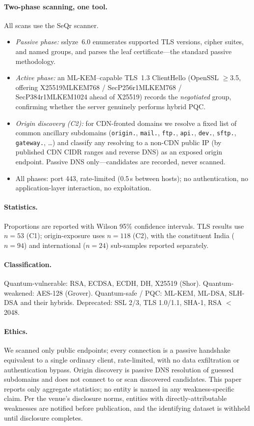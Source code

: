 \documentclass[11pt]{article}
\begin{document}
\paragraph{Two-phase scanning, one tool.} All scans use the SeQr scanner.
\begin{itemize}[leftmargin=1.4em,nosep]
  \item \emph{Passive phase:} sslyze~6.0 enumerates supported TLS versions, cipher suites, and
  named groups, and parses the leaf certificate---the standard passive methodology.
  \item \emph{Active phase:} an ML-KEM--capable TLS~1.3 ClientHello (OpenSSL $\geq$3.5, offering
  X25519MLKEM768 / SecP256r1MLKEM768 / SecP384r1MLKEM1024 ahead of X25519) records the
  \emph{negotiated} group, confirming whether the server genuinely performs hybrid PQC.
  \item \emph{Origin discovery (C2):} for CDN-fronted domains we resolve a fixed list of common
  ancillary subdomains (\texttt{origin.}, \texttt{mail.}, \texttt{ftp.}, \texttt{api.},
  \texttt{dev.}, \texttt{sftp.}, \texttt{gateway.}, \dots) and classify any resolving to a non-CDN
  public IP (by published CDN CIDR ranges and reverse DNS) as an exposed origin endpoint. Passive
  DNS only---candidates are recorded, never scanned.
  \item All phases: port 443, rate-limited (0.5\,s between hosts); no authentication, no
  application-layer interaction, no exploitation.
\end{itemize}

\paragraph{Statistics.} Proportions are reported with Wilson 95\% confidence intervals. TLS
results use $n = 53$ (C1); origin-exposure uses $n = 118$ (C2), with the constituent India
($n = 94$) and international ($n = 24$) sub-samples reported separately.

\paragraph{Classification.} Quantum-vulnerable: RSA, ECDSA, ECDH, DH, X25519 (Shor).
Quantum-weakened: AES-128 (Grover). Quantum-safe / PQC: ML-KEM, ML-DSA, SLH-DSA and their
hybrids. Deprecated: SSL 2/3, TLS 1.0/1.1, SHA-1, RSA $<$ 2048.

\paragraph{Ethics.} We scanned only public endpoints; every connection is a passive handshake
equivalent to a single ordinary client, rate-limited, with no data exfiltration or authentication
bypass. Origin discovery is passive DNS resolution of guessed subdomains and does not connect to
or scan discovered candidates. This paper reports only aggregate statistics; no entity is named in
any weakness-specific claim. Per the venue's disclosure norms, entities with directly-attributable
weaknesses are notified before publication, and the identifying dataset is withheld until
disclosure completes.
\end{document}
